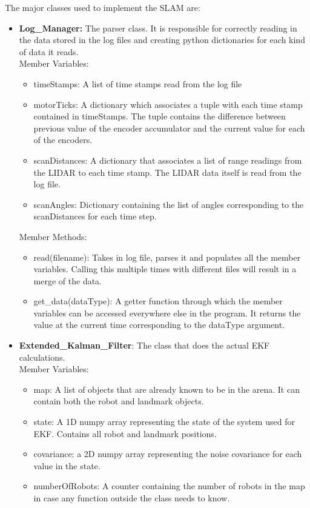 The major classes used to implement the \ekf SLAM are:
\begin{itemize}
	\item \textbf{Log\_Manager:} The parser class. It is responsible for correctly reading in the data stored in the log files and creating python dictionaries for each kind of data it reads.\\
	Member Variables: 
	\begin{itemize}
		\item timeStamps: A list of time stamps read from the log file
		\item motorTicks: A dictionary which associates a tuple with each time stamp contained in timeStamps. The tuple contains the difference between previous value of the encoder accumulator and the current value for each of the encoders. 
		\item scanDistances: A dictionary that associates a list of range readings from the LIDAR to each time stamp. The LIDAR data itself is read from the log file.
		\item scanAngles: Dictionary containing the list of angles corresponding to the scanDistances for each time step.
	\end{itemize}
	Member Methods:
	\begin{itemize}
		\item read(filename): Takes in log file, parses it and populates all the member variables. Calling this multiple times with different files will result in a merge of the data. 
		\item get\_data(dataType): A getter function through which the member variables can be accessed everywhere else in the program. It returns the value at the current time corresponding to the dataType argument.
	\end{itemize}
	\item \textbf{Extended\_Kalman\_Filter}: The class that does the actual EKF calculations. \\
	Member Variables:
	\begin{itemize}
		\item map: A list of objects that are already known to be in the arena. It can contain both the robot and landmark objects.
		\item state: A 1D numpy array representing the state of the system used for EKF. Contains all robot and landmark positions.
		\item covariance: a 2D numpy array representing the noise covariance for each value in the state. 
		\item numberOfRobots: A counter containing the number of robots in the map in case any function outside the class needs to know.

\end{itemize}
\end{itemize}
